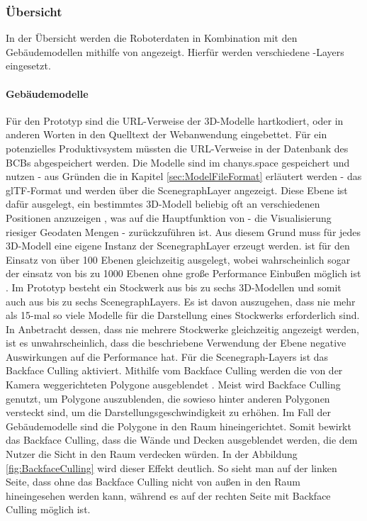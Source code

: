 \subsubsection{Übersicht}
In der Übersicht werden die Roboterdaten in Kombination mit den Gebäudemodellen mithilfe von \deckgl{} angezeigt. Hierfür werden verschiedene \deckgl{}-Layers eingesetzt.

\paragraph{Gebäudemodelle}
Für den Prototyp sind die \ac{URL}-Verweise der 3D-Modelle hartkodiert, oder in anderen Worten in den Quelltext der Webanwendung eingebettet. Für ein potenzielles Produktivsystem müssten die \ac{URL}-Verweise in der Datenbank des \ac{BCB}s abgespeichert werden. Die Modelle sind im chanys.space gespeichert und nutzen - aus Gründen die in Kapitel \ref{sec:ModelFileFormat} erläutert werden - das \ac{glTF}-Format und werden über die ScenegraphLayer angezeigt. Diese Ebene ist dafür ausgelegt, ein bestimmtes 3D-Modell beliebig oft an verschiedenen Positionen anzuzeigen \cite{DeckglScenegraphLayer}, was auf die Hauptfunktion von \deckgl{} - die Visualisierung riesiger Geodaten Mengen \cite{Deckgl} - zurückzuführen ist. Aus diesem Grund muss für jedes 3D-Modell eine eigene Instanz der ScenegraphLayer erzeugt werden. \deckgl{} ist für den Einsatz von über 100 Ebenen gleichzeitig ausgelegt, wobei wahrscheinlich sogar der einsatz von bis zu 1000 Ebenen ohne große Performance Einbußen möglich ist \cite{DeckglPerformance}. Im Prototyp besteht ein Stockwerk aus bis zu sechs 3D-Modellen und somit auch aus bis zu sechs ScenegraphLayers. Es ist davon auszugehen, dass nie mehr als 15-mal so viele Modelle für die Darstellung eines Stockwerks erforderlich sind. In Anbetracht dessen, dass nie mehrere Stockwerke gleichzeitig angezeigt werden, ist es unwahrscheinlich, dass die beschriebene Verwendung der Ebene negative Auswirkungen auf die Performance hat. Für die Scenegraph-Layers ist das Backface Culling aktiviert. Mithilfe vom Backface Culling werden die von der Kamera weggerichteten Polygone ausgeblendet \cite{BackfaceCulling}. Meist wird Backface Culling genutzt, um Polygone auszublenden, die sowieso hinter anderen Polygonen versteckt sind, um die Darstellungsgeschwindigkeit zu erhöhen. Im Fall der Gebäudemodelle sind die Polygone in den Raum hineingerichtet. Somit bewirkt das Backface Culling, dass die Wände und Decken ausgeblendet werden, die dem Nutzer die Sicht in den Raum verdecken würden. In der Abbildung \ref{fig:BackfaceCulling} wird dieser Effekt deutlich. So sieht man auf der linken Seite, dass ohne das Backface Culling nicht von außen in den Raum hineingesehen werden kann, während es auf der rechten Seite mit Backface Culling möglich ist.


